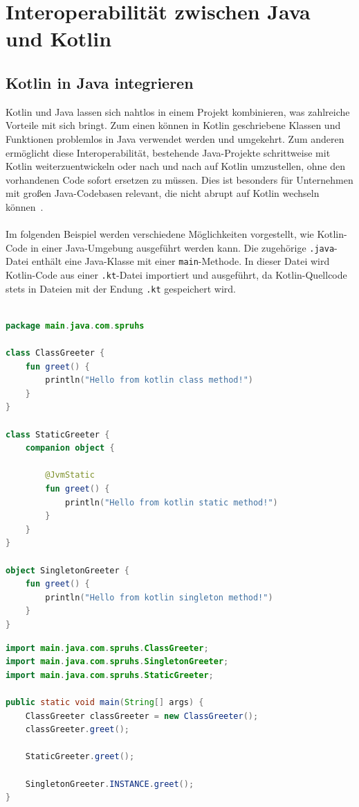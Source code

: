 \documentclass[11pt]{article}
\begin{document}
    \section{Interoperabilität zwischen Java und Kotlin}

    \subsection{Kotlin in Java integrieren}
    Kotlin und Java lassen sich nahtlos in einem Projekt kombinieren, was zahlreiche Vorteile mit sich bringt.
    Zum einen können in Kotlin geschriebene Klassen und Funktionen problemlos in Java verwendet werden und umgekehrt.
    Zum anderen ermöglicht diese Interoperabilität, bestehende Java-Projekte schrittweise mit Kotlin weiterzuentwickeln oder nach und nach auf Kotlin umzustellen, ohne den vorhandenen Code sofort ersetzen zu müssen.
    Dies ist besonders für Unternehmen mit großen Java-Codebasen relevant, die nicht abrupt auf Kotlin wechseln können~\cite[20]{kotlin-handbuch}.\\
    \\
    Im folgenden Beispiel werden verschiedene Möglichkeiten vorgestellt, wie Kotlin-Code in einer Java-Umgebung ausgeführt werden kann.
    Die zugehörige \texttt{.java}-Datei enthält eine Java-Klasse mit einer \texttt{main}-Methode.
    In dieser Datei wird Kotlin-Code aus einer \texttt{.kt}-Datei importiert und ausgeführt, da Kotlin-Quellcode stets
    in Dateien mit der Endung \texttt{.kt} gespeichert wird.\\
    \\

    \begin{lstlisting}[language=Kotlin, caption={KotlinGreeter.kt}]
package main.java.com.spruhs

class ClassGreeter {
    fun greet() {
        println("Hello from kotlin class method!")
    }
}

class StaticGreeter {
    companion object {

        @JvmStatic
        fun greet() {
            println("Hello from kotlin static method!")
        }
    }
}

object SingletonGreeter {
    fun greet() {
        println("Hello from kotlin singleton method!")
    }
}
    \end{lstlisting}

    \begin{lstlisting}[language=Java, caption={Main.java}]
import main.java.com.spruhs.ClassGreeter;
import main.java.com.spruhs.SingletonGreeter;
import main.java.com.spruhs.StaticGreeter;

public static void main(String[] args) {
    ClassGreeter classGreeter = new ClassGreeter();
    classGreeter.greet();

    StaticGreeter.greet();

    SingletonGreeter.INSTANCE.greet();
}
    \end{lstlisting}
\end{document}

